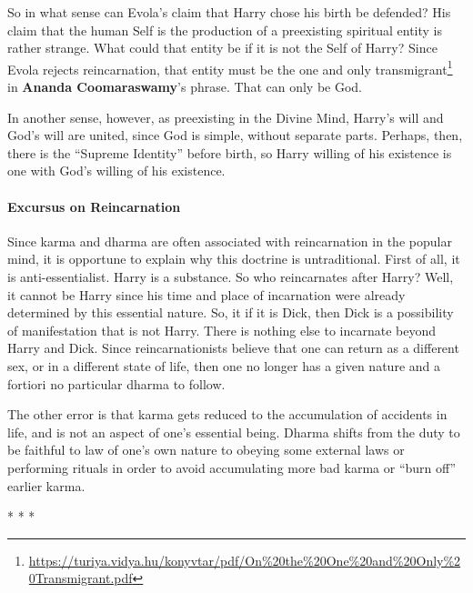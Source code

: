So in what sense can Evola's claim that Harry chose his birth be defended? His claim that the human Self is the production of a preexisting spiritual entity is rather strange. What could that entity be if it is not the Self of Harry? Since Evola rejects reincarnation, that entity must be the one and only transmigrant\footnote{\url{https://turiya.vidya.hu/konyvtar/pdf/On\%20the\%20One\%20and\%20Only\%20Transmigrant.pdf}} in \textbf{Ananda Coomaraswamy}'s phrase. That can only be God.

In another sense, however, as preexisting in the Divine Mind, Harry's will and God's will are united, since God is simple, without separate parts. Perhaps, then, there is the ``Supreme Identity'' before birth, so Harry willing of his existence is one with God's willing of his existence.

\paragraph{Excursus on Reincarnation}


Since karma and dharma are often associated with reincarnation in the popular mind, it is opportune to explain why this doctrine is untraditional. First of all, it is anti-essentialist. Harry is a substance. So who reincarnates after Harry? Well, it cannot be Harry since his time and place of incarnation were already determined by this essential nature. So, it if it is Dick, then Dick is a possibility of manifestation that is not Harry. There is nothing else to incarnate beyond Harry and Dick. Since reincarnationists believe that one can return as a different sex, or in a different state of life, then one no longer has a given nature and a fortiori no particular dharma to follow.

The other error is that karma gets reduced to the accumulation of accidents in life, and is not an aspect of one's essential being. Dharma shifts from the duty to be faithful to law of one's own nature to obeying some external laws or performing rituals in order to avoid accumulating more bad karma or ``burn off'' earlier karma.



\begin{center}* * *\end{center}

